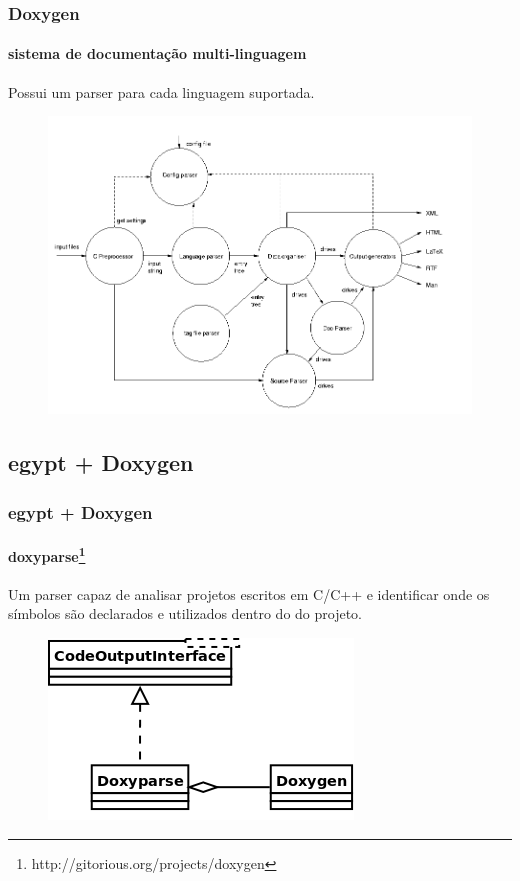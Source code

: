 \documentclass{beamer}
\begin{document}
\begin{frame}
\frametitle{Doxygen}
\framesubtitle{sistema de documentação multi-linguagem}
 Possui um parser para cada linguagem suportada.
 \begin{figure}[h]
 \center
 \includegraphics[scale=0.25]{imagens/doxygen-internals-flow}
 \label{fig:doxygen-internals-flow}
 \end{figure}
\end{frame}

\subsection{egypt + Doxygen}

\begin{frame}
\frametitle{egypt + Doxygen}
\framesubtitle{doxyparse\footnote{http://gitorious.org/projects/doxygen}}
 Um parser capaz de analisar projetos escritos em C/C++ e identificar onde os
 símbolos são declarados e utilizados dentro do do projeto.
 \begin{figure}[h]
 \center
 \includegraphics[scale=0.3]{imagens/doxyparse-diagram}
 \label{doxyparse-diagram}
 \end{figure}
\end{frame}
\end{document}
